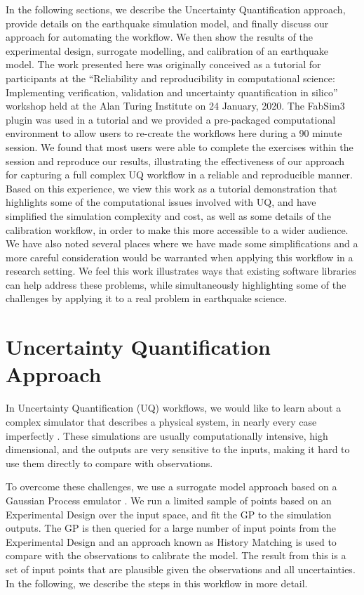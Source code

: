 \documentclass[openacc]{rstransa}%
\begin{document}
In the following sections, we describe the Uncertainty Quantification approach, provide details
on the earthquake simulation model, and finally discuss our approach for automating the workflow.
We then show the results of the experimental design, surrogate modelling, and calibration
of an earthquake model. The work presented here was originally conceived as a tutorial for participants at the
``Reliability and reproducibility in computational science: Implementing verification, validation and uncertainty quantification in silico'' workshop held at the Alan Turing Institute on 24 January, 2020.
The FabSim3 plugin was used in a tutorial and we provided a pre-packaged computational environment
to allow users to re-create the workflows here during a 90 minute session. We found that most
users were able to complete the exercises within the session and reproduce our results,
illustrating the effectiveness of our approach for capturing a full complex UQ workflow
in a reliable and reproducible manner. Based on this experience,
we view this work as a tutorial demonstration that highlights
some of the computational issues involved with UQ, and have simplified the
simulation complexity and cost, as well as some details of the calibration
workflow, in order to make this more accessible to a wider audience.
We have also noted several places where we have made some simplifications
and a more careful consideration would be
warranted when applying this workflow in a research setting.
We feel this work illustrates ways that existing
software libraries can help address these problems, while simultaneously
highlighting some of the challenges by applying it to a real problem
in earthquake science.

\section{Uncertainty Quantification Approach}

In Uncertainty Quantification (UQ) workflows, we would like to learn about a complex simulator that describes
a physical system, in nearly every case imperfectly \cite{experimentaldesign,calibration}.
These simulations are usually computationally intensive,
high dimensional, and the outputs are very sensitive to the inputs, making it hard to use them directly
to compare with observations.

To overcome these challenges, we use a surrogate model approach based on a Gaussian Process emulator \cite{gprw}.
We run a limited sample of points based on an Experimental Design over the input space, and fit the GP
to the simulation outputs. The GP is then queried for a large number of input points from the Experimental
Design and an approach known as History Matching is used to compare with the observations
to calibrate the model. The result from this is a set of input points that are plausible given the
observations and all uncertainties. In the following, we describe the steps in this workflow in more detail.
\end{document}
